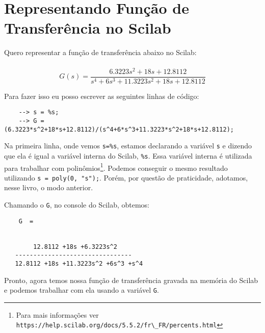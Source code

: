 \section{Representando Função de Transferência no Scilab}



Quero representar a função de transferência abaixo no Scilab:
\\
\\
$$G(s) = \frac{6.3223s^{2}+18s+12.8112}{s^{4}+6s^{3}+11.3223s^{2}+ 18s + 12.8112  
}$$

Para fazer isso eu posso escrever as seguintes linhas de código:

\begin{verbatim}
    --> s = %s;
    --> G = (6.3223*s^2+18*s+12.8112)/(s^4+6*s^3+11.3223*s^2+18*s+12.8112);
\end{verbatim}

Na primeira linha, onde vemos \verb|s=%s|, estamos declarando a variável \verb|s| e dizendo que ela é igual a variável interna do Scilab, \verb|%s|. Essa variável interna é utilizada para trabalhar com polinômios\footnote{Para mais informações ver \verb|https://help.scilab.org/docs/5.5.2/fr\_FR/percents.html|}. Podemos conseguir o mesmo resultado utilizando \verb|s = poly(0, "s");|. Porém, por questão de praticidade, adotamos, nesse livro, o modo anterior.

Chamando o \verb|G|, no console do Scilab, obtemos:

\begin{verbatim}
    G  = 

                                     
        12.8112 +18s +6.3223s^2       
   --------------------------------  
   12.8112 +18s +11.3223s^2 +6s^3 +s^4
\end{verbatim}

Pronto, agora temos nossa função de transferência gravada na memória do Scilab e podemos trabalhar com ela usando a variável \verb|G|.

\newpage

